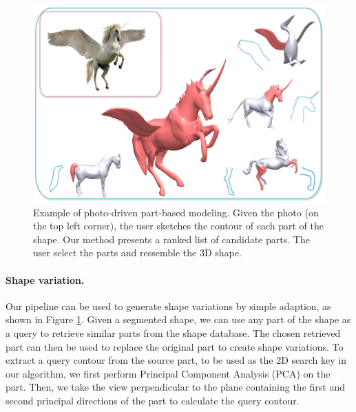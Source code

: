 \begin{figure}\centering
\includegraphics[width=\linewidth]{./Material/PhotoDrivenModeling.pdf}
\caption{Example of photo-driven part-based modeling. Given the photo (on the top left corner), the user sketches the contour of each part of the shape. Our method presents a ranked list of candidate parts. The user select the parts and ressemble the 3D shape.}\label{fig:SegedAsInput}
\end{figure}

\paragraph*{Shape variation.} Our pipeline can be used to generate shape variations by simple adaption, as shown in Figure \ref{fig:SegedAsInput}. Given a segmented shape, we can use any part of the shape as a query to retrieve similar parts from the shape database. The chosen retrieved part can then be used to replace the original part to create shape variations. To extract a query contour from the source part, to be used as the 2D search key in our algorithm, we first perform Principal Component Analysis (PCA) on the part. Then, we take the view perpendicular to the plane containing the first and second principal directions of the part to calculate the query contour.

